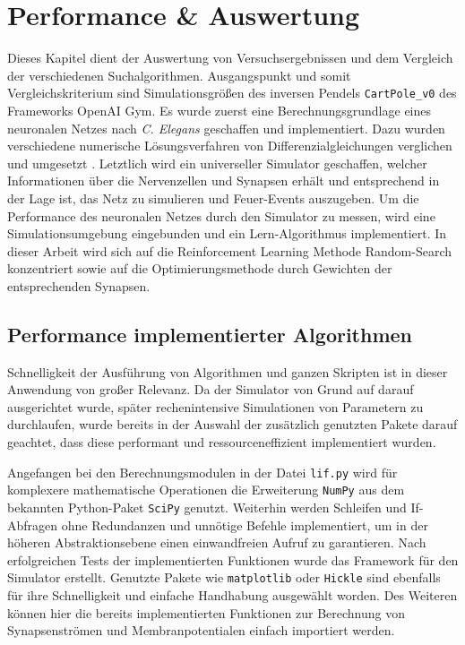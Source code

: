 %
\chapter{Performance \& Auswertung}
\label{chap:erg}
%
	Dieses Kapitel dient der Auswertung von Versuchsergebnissen und dem Vergleich der verschiedenen Suchalgorithmen. Ausgangspunkt und somit Vergleichskriterium sind Simulationsgrößen des inversen Pendels \texttt{CartPole\_v0} des Frameworks OpenAI Gym.	Es wurde zuerst eine Berechnungsgrundlage eines neuronalen Netzes nach \textit{C. Elegans} \cite{CElegans} geschaffen und implementiert. Dazu wurden verschiedene numerische Lösungsverfahren von Differenzialgleichungen verglichen und umgesetzt \cite{NonlinearDynamics}. Letztlich wird ein universeller Simulator geschaffen, welcher Informationen über die Nervenzellen und Synapsen erhält und entsprechend in der Lage ist, das Netz zu simulieren und Feuer-Events auszugeben. Um die Performance des neuronalen Netzes durch den Simulator zu messen, wird eine Simulationsumgebung eingebunden und ein Lern-Algorithmus implementiert. In dieser Arbeit wird sich auf die Reinforcement Learning Methode Random-Search konzentriert sowie auf die Optimierungsmethode durch Gewichten der entsprechenden Synapsen.

\section{Performance implementierter Algorithmen}
\label{sec:erg_performance}
	Schnelligkeit der Ausführung von Algorithmen und ganzen Skripten ist in dieser Anwendung von großer Relevanz. Da der Simulator von Grund auf darauf ausgerichtet wurde, später rechenintensive Simulationen von Parametern zu durchlaufen, wurde bereits in der Auswahl der zusätzlich genutzten Pakete darauf geachtet, dass diese performant und ressourceneffizient implementiert wurden.
	
	Angefangen bei den Berechnungsmodulen in der Datei \texttt{lif.py} wird für komplexere mathematische Operationen die Erweiterung \texttt{NumPy} \cite{NumPy} aus dem bekannten Python-Paket \texttt{SciPy} \cite{NumPy} genutzt. Weiterhin werden Schleifen und If-Abfragen ohne Redundanzen und unnötige Befehle implementiert, um in der höheren Abstraktionsebene einen einwandfreien Aufruf zu garantieren. Nach erfolgreichen Tests der implementierten Funktionen wurde das Framework für den Simulator erstellt. Genutzte Pakete wie \texttt{matplotlib} \cite{Hunter2007} oder \texttt{Hickle} \cite{hdf5} sind ebenfalls für ihre Schnelligkeit und einfache Handhabung ausgewählt worden. Des Weiteren können hier die bereits implementierten Funktionen zur Berechnung von Synapsenströmen und Membranpotentialen einfach importiert werden.
	
